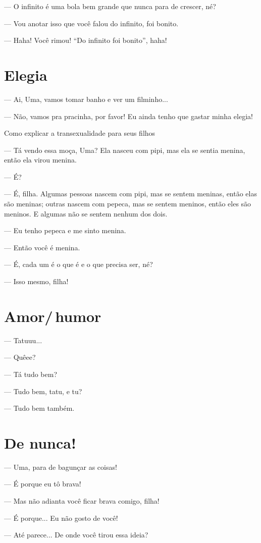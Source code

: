 {— O infinito é uma bola bem grande que nunca para de crescer, né?

— Vou anotar isso que você falou do infinito, foi bonito.

— Haha! Você rimou! ``Do infinito foi bonito'', haha!

\chapter{Elegia}

— Ai, Uma, vamos tomar banho e ver um filminho...

— Não, vamos pra pracinha, por favor! Eu ainda tenho que gastar minha
elegia!

Como explicar a transexualidade para seus filhos

— Tá vendo essa moça, Uma? Ela nasceu com pipi, mas ela se sentia
menina, então ela virou menina.

— É?

— É, filha. Algumas pessoas nascem com pipi, mas se sentem meninas,
então elas são meninas; outras nascem com pepeca, mas se sentem meninos,
então eles são meninos. E algumas não se sentem nenhum dos dois.

— Eu tenho pepeca e me sinto menina.

— Então você é menina.

— É, cada um é o que é e o que precisa ser, né?

— Isso mesmo, filha!

\chapter{Amor/\,humor}

— Tatuuu...

— Quêee?

— Tá tudo bem?

— Tudo bem, tatu, e tu?

— Tudo bem também.

\chapter{De nunca!}

— Uma, para de bagunçar as coisas!

— É porque eu tô brava!

— Mas não adianta você ficar brava comigo, filha!

— É porque... Eu não gosto de você!

— Até parece... De onde você tirou essa ideia?

}
